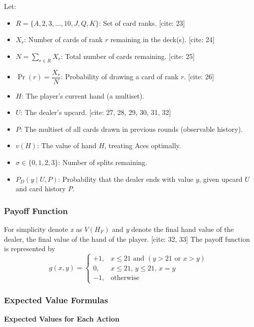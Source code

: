 \documentclass[12pt,a4paper]{cibb}
\begin{document}
Let:
\begin{itemize}
    \item \( R = \{A, 2, 3, \dots, 10, J, Q, K\} \): Set of card ranks. [cite: 23]
    \item \( X_r \): Number of cards of rank \(r\) remaining in the deck(s). [cite: 24]
    \item \( N = \sum_{r \in R} X_r \): Total number of cards remaining. [cite: 25]
    \item \( \Pr(r) = \dfrac{X_r}{N} \): Probability of drawing a card of rank \(r\). [cite: 26]
    \item \( H \): The player's current hand (a multiset).
    \item \( U \): The dealer's upcard. [cite: 27, 28, 29, 30, 31, 32]
    \item \( P \): The multiset of all cards drawn in previous rounds (observable history).
    \item \( v(H) \): The value of hand \(H\), treating Aces optimally.
    \item \( σ \in \{0,1,2,3\} \): Number of splits remaining.
    \item \( P_D(y \mid U, P) \): Probability that the dealer ends with value \(y\), given upcard \(U\) and card history \(P\).
\end{itemize}

\subsubsection*{Payoff Function}
For simplicity denote \textit{x} as \( V(H_F)\) and \textit{y} denote the final hand value of the dealer, the final value of the hand of the player. [cite: 32, 33]
The payoff function is represented by
\[
g(x, y) =
\begin{cases}
+1, & x \leq 21 \text{ and } (y > 21 \text{ or } x > y) \\
0, & x \leq 21,\, y \leq 21,\, x = y \\
-1, & \text{otherwise}
\end{cases}
\]
\subsubsection*{Expected Value Formulas}

\textbf{Expected Values for Each Action}
\end{document}

